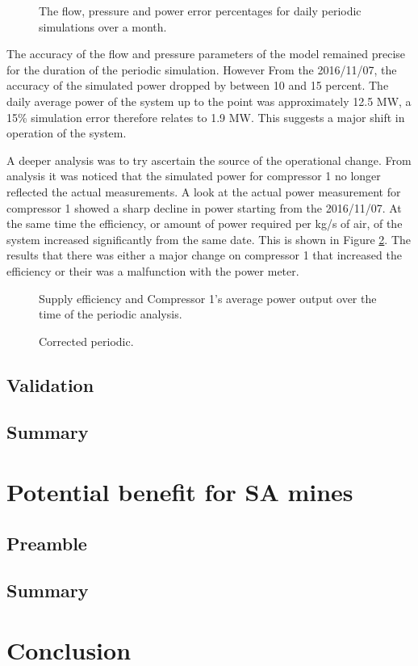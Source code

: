 	\begin{figure}[h]
		\centering
		\fbox{}
		\caption{The flow, pressure and power error percentages for daily periodic simulations over a month.}
		\label{fig: Periodic simulation}
	\end{figure}   
The accuracy of the flow and pressure parameters of the model remained precise for the duration of the periodic simulation. However From the 2016/11/07, the accuracy of the simulated power dropped by between 10 and 15 percent. The daily average power of the system up to the point was approximately 12.5 MW, a 15\% simulation error therefore relates to 1.9 MW. This suggests a major shift in operation of the system.
\par 
A deeper analysis was to try ascertain the source of the operational change. From analysis it was noticed that the simulated power for compressor 1  no longer reflected the actual measurements. A look at the actual power measurement for compressor 1 showed a sharp decline in power starting from the 2016/11/07. At the same time the efficiency, or amount of power required per kg/s of air, of the system increased significantly from the same date. This is shown in Figure \ref{fig: MeasurementAccuracy.}. The results that there was either a major change on compressor 1 that increased the efficiency or their was a malfunction with the power meter.
	\begin{figure}[h]
		\centering
		\fbox{}
		\caption{Supply efficiency and Compressor 1's average power output over the time of the periodic analysis.}
		\label{fig: MeasurementAccuracy.}
	\end{figure}    
	\begin{figure}[h]
		\centering
		\fbox{}
		\caption{Corrected periodic.}
		\label{fig: Corrected Periodic simulation}
	\end{figure}    
	\subsection{Validation}
	\subsection{Summary}
\section{Potential benefit for SA mines}
	\subsection{Preamble}
	\subsection{Summary}
\section{Conclusion}